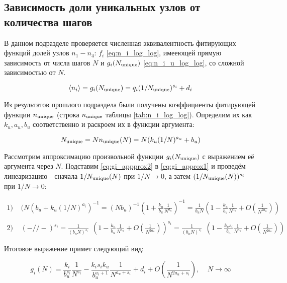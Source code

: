 \subsection{Зависимость доли уникальных узлов от количества шагов}

В данном подразделе проверяется численная эквивалентность фитирующих функций долей узлов $n_1-n_4$: $f_i$ \eqref{eq:n_i_log_log}, имееющей прямую зависимость от числа шагов $N$ и $g_i(N_{\textup{unique}})$ \eqref{eq:n_i_u_log_log}, со сложной зависимостью от $N$.

\begin{equation}
	\langle n_i \rangle = g_i(N_{\textup{unique}}) = q_i (1/N_{\textup{unique}})^{s_i} + d_i
	\label{eq:gi_approx1}
\end{equation}

Из результатов прошлого подраздела были получены коэффициенты фитирующей функции $n_{\textup{unique}}$ (строка $n_{\textup{unique}}$ таблицы \ref{tab:n_i_log_log}). Определим их как $k_u, a_u, b_u$ соответственно и раскроем их в функции аргумента: 

\begin{equation}
	N_{\textup{unique}} = N n_{\textup{unique}}(N) = N (k_u (1/N)^{a_u} + b_u)
	\label{eq:gi_appprox2}
\end{equation}

Рассмотрим аппроксимацию произвольной функции $g_i(N_{\textup{unique}})$ с выражением её аргумента через $N$.
Подставим \eqref{eq:gi_appprox2} в \eqref{eq:gi_approx1} и проведём линеаризацию - сначала $1/N_{\textup{unique}}(N)$ при $1/N \to 0$, а затем $(1/N_{\textup{unique}}(N))^{s_i}$ при $1/N \to 0$:

\begin{Large}
\begin{equation*}
\begin{array}{l}
1)\ \ \ \ \ (N (b_u + k_u(1/N)^{a_i})^{-1} = ( N b_u)^{-1} (1 + \frac{k_u}{b_u} \frac{1}{N^{a_u}})^{-1} = \frac{1}{b_u N} (1 - \frac{k_u}{b_u} \frac{1}{N^{a_u}} + O(\frac{1}{N^{2a_u}})) \\
\\
2)\ \ \ \ \ ( - // - )^{s_i}  = \frac{1}{(b_u N)^{s_i}} \ \  (1 - \frac{k_u}{b_u} \frac{1}{N^{a_u}} + O(\frac{1}{N^{2a_u}}))^{s_i} = \frac{1}{(b_u N)^{s_i}}\ \ (1 - \frac{k_u s_i}{b_u} \frac{1}{N^{a_u}} + O(\frac{1}{N^{2a_u}}))
\end{array}
\end{equation*}
\end{Large}

Итоговое выражение примет следующий вид:

\begin{large}
\begin{equation}
g_i(N) = \frac{k_i}{b_u^{s_i}} \frac{1}{N^{s_i}} - \frac{k_i s_i k_u}{b_u^{a_i+1}} \frac{1}{N^{a_u+s_i}} + d_i + O(\frac{1}{N^{2 a_u +s_i}}),\ \ \ \ \ N \to \infty
\end{equation}
\label{eq:g_n_expect}
\end{large}

